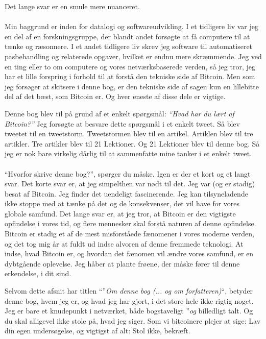 \documentclass[paper=6in:9in,pagesize=pdftex,headinclude=on,footinclude=on,12pt]{scrbook}
\begin{document}
Det lange svar er en smule mere nuanceret.\paragraph{} Min baggrund er inden for datalogi og softwareudvikling. I et tidligere liv var jeg en del af en forskningsgruppe, der blandt andet forsøgte at få computere til at tænke og ræsonnere. I et andet tidligere liv skrev jeg software til automatiseret pasbehandling og relaterede opgaver, hvilket er endnu mere skræmmende. Jeg ved en ting eller to om computere og vores netværksbaserede verden, så jeg tror, jeg har et lille forspring i forhold til at forstå den tekniske side af Bitcoin. Men som jeg forsøger at skitsere i denne bog, er den tekniske side af sagen kun en lillebitte del af det bæst, som Bitcoin er. Og hver eneste af disse dele er vigtige.

Denne bog blev til på grund af et enkelt spørgsmål: \textit{\enquote{Hvad har du lært af Bitcoin?}} Jeg forsøgte at besvare dette spørgsmål i et enkelt tweet. Så blev tweetet til en tweetstorm. Tweetstormen blev til en artikel. Artiklen blev til tre artikler. Tre artikler blev til 21 Lektioner. Og 21 Lektioner blev til denne bog. Så jeg er nok bare virkelig dårlig til at sammenfatte mine tanker i et enkelt tweet.\paragraph{} \enquote{Hvorfor skrive denne bog?}, spørger du måske. Igen er der et kort og et langt svar. Det korte svar er, at jeg simpelthen var nødt til det. Jeg var (og er stadig) besat af Bitcoin. Jeg finder det uendeligt fascinerende. Jeg kan tilsyneladende ikke stoppe med at tænke på det og de konsekvenser, det vil have for vores globale samfund. Det lange svar er, at jeg tror, at Bitcoin er den vigtigste opfindelse i vores tid, og flere mennesker skal forstå naturen af denne opfindelse. Bitcoin er stadig et af de mest misforståede fænomener i vores moderne verden, og det tog mig år at fuldt ud indse alvoren af denne fremmede teknologi. At indse, hvad Bitcoin er, og hvordan det fænomen vil ændre vores samfund, er en dybtgående oplevelse. Jeg håber at plante frøene, der måske fører til denne erkendelse, i dit sind.

Selvom dette afsnit har titlen \enquote{}\textit{Om denne bog (... og om forfatteren)}\enquote{, betyder denne bog, hvem jeg er, og hvad jeg har gjort, i det store hele ikke rigtig noget. Jeg er bare et knudepunkt i netværket, både bogstaveligt }\textit{og} billedligt talt. Og du skal alligevel ikke stole på, hvad jeg siger. Som vi bitcoinere plejer at sige: Lav din egen undersøgelse, og vigtigst af alt: Stol ikke, bekræft.
\end{document}
